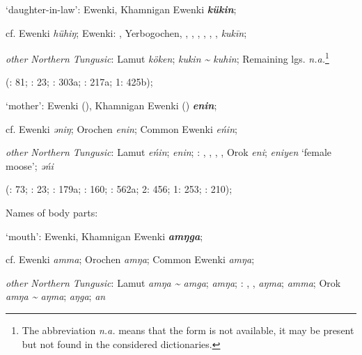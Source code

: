 \documentclass[output=paper,colorlinks,citecolor=brown]{langscibook}
\begin{document}
\begin{xlist}
\begin{xlist}
    \ex ‘daughter-in-law’:  Ewenki, Khamnigan Ewenki \textbf{\textit{kükin}};

    cf.  Ewenki \textit{hühiŋ};  Ewenki: , Yerbogochen, , , , , , ,  \textit{kukīn};

    \textit{other Northern Tungusic}: Lamut \textit{köken};  \textit{kukin {\textasciitilde} kuhin}; Remaining lgs. \textit{n.a.}\footnote{The abbreviation \textit{n.a.} means that the form is not available, it may be present but not found in the considered dictionaries.}
    
    (\citealt{Castrén1856}: 81; \citealt{Janhunen1991}: 23; \citealt{Dorji1998}: 303a; \citealt{Vasilevic1958}: 217a; \citealt{Cincius1975B} 1: 425b); 


    \ex ‘mother’:  Ewenki (), Khamnigan Ewenki () \textbf{\textit{enin}};

    cf.  Ewenki \textit{ǝniŋ}; Orochen \textit{enin};  Common Ewenki \textit{eńin};

    \textit{other Northern Tungusic}: Lamut \textit{eńin};  \textit{enin}; \textit{}: , , , , Orok \textit{eni};  \textit{eniyen} ‘female moose’;  \textit{ǝńi}
    
    (\citealt{Castrén1856}: 73; \citealt{Janhunen1991}: 23; \citealt{Dorji1998}: 179a; \citealt{Chaoke2014a}: 160; \citealt{Vasilevic1958}: 562a; \citealt{Cincius1975B} 2: 456; \citealt{Hauer1952} 1: 253; \citealt{Zikmundová2013a}: 210);

\end{xlist}


    \ex Names of body parts:

\begin{xlist}
    \ex ‘mouth’:  Ewenki, Khamnigan Ewenki \textbf{\textit{amŋga}};

    cf.  Ewenki \textit{amma}; Orochen \textit{amŋa};  Common Ewenki \textit{amŋa};

    \textit{other Northern Tungusic}: Lamut \textit{amŋa {\textasciitilde} amga};  \textit{amŋa}; \textit{}: , ,  \textit{aŋma};  \textit{amma}; Orok \textit{amŋa {\textasciitilde} aŋma};  \textit{aŋga};  \textit{an} 
    

\end{xlist}
\end{xlist}
\end{document}
